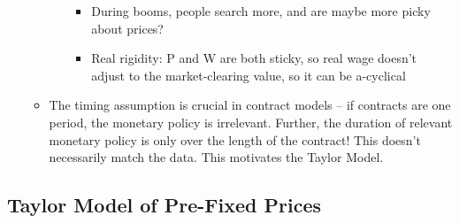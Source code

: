 \documentclass[12pt]{article}
\begin{document}
\begin{itemize}
\begin{itemize}
\begin{itemize}
\begin{itemize}
                \item During booms, people search more, and are maybe more picky about prices?
                \item Real rigidity: P and W are both sticky, so real wage doesn't adjust to the market-clearing value, so it can be a-cyclical
            \end{itemize}
        \end{itemize}
        \item The timing assumption is crucial in contract models -- if contracts are one period, the monetary policy is irrelevant. Further, the duration of relevant monetary policy is only over the length of the contract! This doesn't necessarily match the data. This motivates the Taylor Model.
    \end{itemize}
\end{itemize}

\subsection{Taylor Model of Pre-Fixed Prices}
\end{document}
